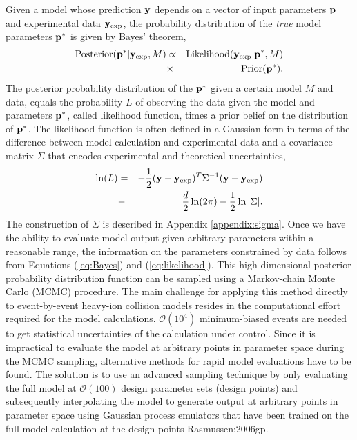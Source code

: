 Given a model whose prediction ${\bf y}$ depends on a vector of input parameters ${\bf p}$ and  experimental data ${\bf y}_\textrm{exp}$, 
the probability distribution of the {\it true} model parameters ${\bf p^*}$ is given by Bayes' theorem, 
\begin{eqnarray}\label{eq:Bayes}
\textrm{Posterior}({\bf p^*}|{\bf y}_\textrm{exp}, M) &\propto& \textrm{Likelihood}({\bf y}_\textrm{exp}|{\bf p^*}, M) \nonumber \\ &\times& \textrm{Prior}({\bf p^*}).
\end{eqnarray}
The posterior probability distribution of the ${\bf p^*}$ given a certain model $M$ and data, equals the probability $L$ of observing the data given the model and parameters ${\bf p^*}$, called likelihood function, times a prior belief on the distribution of ${\bf p^*}$.
The likelihood function is often defined in a Gaussian form in terms of the difference between model calculation and experimental data and a covariance matrix $\Sigma$ that encodes experimental and theoretical uncertainties,
\begin{eqnarray}\label{eq:likelihood}
\ln(L) &=& -\frac{1}{2}({\bf y}-{\bf y}_{\textrm{exp}})^T\Sigma^{-1} ({\bf y}-{\bf y}_{\textrm{exp}})\nonumber\\ 
		&-&\frac{d}{2}\ln(2\pi)-\frac{1}{2}\ln|\Sigma|.
\end{eqnarray}
The construction of $\Sigma$ is described in Appendix \ref{appendix:sigma}.
Once we have the ability to evaluate model output given arbitrary parameters within a reasonable range, the information on the parameters constrained by data follows from Equations (\ref{eq:Bayes}) and (\ref{eq:likelihood}).
This high-dimensional posterior probability distribution function can be sampled using a Markov-chain Monte Carlo (MCMC) procedure.
The main challenge for applying this method directly to event-by-event heavy-ion collision models resides in the computational effort required for the model calculations.  $\mathcal{O}(10^4)$ minimum-biased events are needed to get statistical uncertainties of the calculation under control.
Since it is impractical to evaluate the model  at arbitrary points in parameter space during the MCMC sampling, alternative methods for rapid model evaluations have to be found.
The solution is to use an advanced sampling technique by only evaluating the full model at $\mathcal{O}(100)$ design parameter sets (design points) and subsequently interpolating the model to generate output at arbitrary points in parameter space using  Gaussian process emulators that have been trained on the full model calculation at the design points {Rasmussen:2006gp}.
